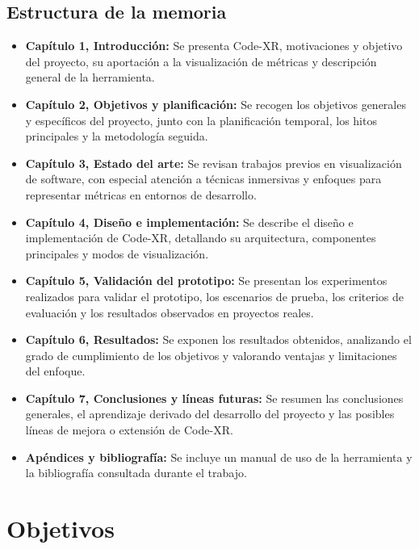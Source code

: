 \documentclass[a4paper, 12pt]{book}
\begin{document}
\section{Estructura de la memoria}
\label{sec:estructura}
\begin{itemize}
    \item \textbf{Capítulo 1, Introducción:} Se presenta Code-XR, motivaciones y objetivo del proyecto, su aportación a la visualización de métricas y descripción general de la herramienta.
    \item \textbf{Capítulo 2, Objetivos y planificación:} Se recogen los objetivos generales y específicos del proyecto, junto con la planificación temporal, los hitos principales y la metodología seguida.
    \item \textbf{Capítulo 3, Estado del arte:} Se revisan trabajos previos en visualización de software, con especial atención a técnicas inmersivas y enfoques para representar métricas en entornos de desarrollo.
    \item \textbf{Capítulo 4, Diseño e implementación:} Se describe el diseño e implementación de Code-XR, detallando su arquitectura, componentes principales y modos de visualización.
    \item \textbf{Capítulo 5, Validación del prototipo:} Se presentan los experimentos realizados para validar el prototipo, los escenarios de prueba, los criterios de evaluación y los resultados observados en proyectos reales.
    \item \textbf{Capítulo 6, Resultados:} Se exponen los resultados obtenidos, analizando el grado de cumplimiento de los objetivos y valorando ventajas y limitaciones del enfoque.
    \item \textbf{Capítulo 7, Conclusiones y líneas futuras:} Se resumen las conclusiones generales, el aprendizaje derivado del desarrollo del proyecto y las posibles líneas de mejora o extensión de Code-XR.
    \item \textbf{Apéndices y bibliografía:} Se incluye un manual de uso de la herramienta y la bibliografía consultada durante el trabajo.
\end{itemize}


\cleardoublepage %
\chapter{Objetivos} %
\label{chap:objetivos} %
\end{document}
